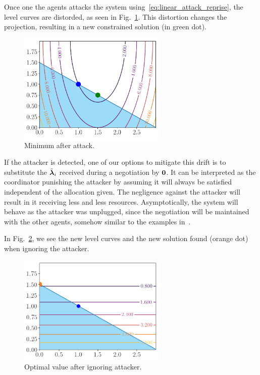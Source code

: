 \documentclass[../main.tex]{subfiles}
\begin{document}
Once one the agents attacks the system using~\eqref{eq:linear_attack_reprise}, the level curves are distorded, as seen in Fig.~\ref{fig:minimum_after_attack}.
This distortion changes the projection, resulting in a new constrained solution (in green dot).
\begin{figure}[h]
  \centering
  \includegraphics[width=7cm]{../img/resilient_eq/new-minimum-selfish.pdf}
  \caption[Minimum after attack.]{Minimum after attack. }\label{fig:minimum_after_attack}
\end{figure}

If the attacker is detected, one of our options to mitigate this drift is to substitute the $\tilde{\boldsymbol{\lambda}}_{i}$ received during a negotiation by $\mathbf{0}$.
It can be interpreted as the coordinator punishing the attacker by assuming it will always be satisfied independent of the allocation given.
The negligence against the attacker will result in it receiving less and less resources. Asymptotically, the system will behave as the attacker was unplugged, since the negotiation will be maintained with the other agents, somehow similar to the examples in~\cite{VelardeEtAl2018,MaestreEtAl2021}.

In Fig.~\ref{fig:minimum_ignoring_attacker}, we see the new level curves and the new solution found (orange dot) when ignoring the attacker.
\begin{figure}[h]
  \centering
  \includegraphics[width=7cm]{../img/resilient_eq/ignoreX.png}
  \caption{Optimal value after ignoring attacker.}\label{fig:minimum_ignoring_attacker}
\end{figure}
\end{document}
